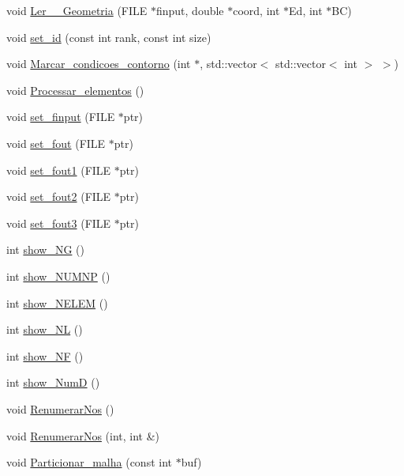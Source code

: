 \begin{DoxyCompactItemize}
\item 
void \hyperlink{classGeProb_a1b1545b917023458df409bd97573bac5}{Ler\+\_\+\+\_\+\+Geometria} (F\+I\+LE $\ast$finput, double $\ast$coord, int $\ast$Ed, int $\ast$BC)
\item 
void \hyperlink{classGeProb_ae922c4a2ec2974c44cbcfa02e56855db}{set\+\_\+id} (const int rank, const int size)
\item 
void \hyperlink{classGeProb_a6fc2ba08f7556408bd9082ed34ada7bd}{Marcar\+\_\+condicoes\+\_\+contorno} (int $\ast$, std\+::vector$<$ std\+::vector$<$ int $>$ $>$)
\item 
void \hyperlink{classGeProb_abe608186b9102498672c115584169d9a}{Processar\+\_\+elementos} ()
\item 
void \hyperlink{classGeProb_adc17f3e57dab093882ec7f7aebea634f}{set\+\_\+finput} (F\+I\+LE $\ast$ptr)
\item 
void \hyperlink{classGeProb_adba307125006b1f5e0bd9a04e05cecf2}{set\+\_\+fout} (F\+I\+LE $\ast$ptr)
\item 
void \hyperlink{classGeProb_a75433e7f3aec6d8f0746cd3e0e82db96}{set\+\_\+fout1} (F\+I\+LE $\ast$ptr)
\item 
void \hyperlink{classGeProb_a18762ac0ce4ba659b15e97a5521bc456}{set\+\_\+fout2} (F\+I\+LE $\ast$ptr)
\item 
void \hyperlink{classGeProb_a2fa255c26250f6ee540b910949f530ed}{set\+\_\+fout3} (F\+I\+LE $\ast$ptr)
\item 
int \hyperlink{classGeProb_a2f37b74c21a3bdc3fc112babc8a0123b}{show\+\_\+\+NG} ()
\item 
int \hyperlink{classGeProb_a9470702789ccb98b8c952d3259bcba7f}{show\+\_\+\+N\+U\+M\+NP} ()
\item 
int \hyperlink{classGeProb_aa9c2c6d251e061c3cf58806097c55f04}{show\+\_\+\+N\+E\+L\+EM} ()
\item 
int \hyperlink{classGeProb_a6a4db729e1c6eab1165fb861b16649ac}{show\+\_\+\+NL} ()
\item 
int \hyperlink{classGeProb_ac7f36c8a5ae46b8ddc8cdd8db059e9cc}{show\+\_\+\+NF} ()
\item 
int \hyperlink{classGeProb_a95d6202865332fd522738383003d7b25}{show\+\_\+\+NumD} ()
\item 
void \hyperlink{classGeProb_a18cfc81b7accb83b55b9e69d2738c5de}{Renumerar\+Nos} ()
\item 
void \hyperlink{classGeProb_aa656597aedeff1096736c98b1f51c55f}{Renumerar\+Nos} (int, int \&)
\item 
void \hyperlink{classGeProb_ac439ec4e4198924d385d8948edb20708}{Particionar\+\_\+malha} (const int $\ast$buf)

\end{DoxyCompactItemize}
